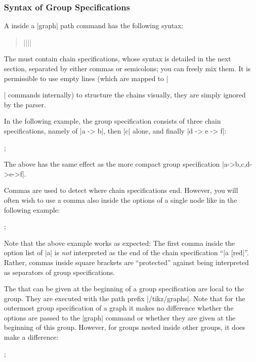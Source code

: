 \subsubsection{Syntax of Group Specifications}
\label{section-library-graphs-group-spec}

A  inside a |graph| path command has the following
syntax:
%
\begin{quote}
    |{||}|
\end{quote}
%
The  must contain chain specifications, whose syntax
is detailed in the next section, separated by either commas or semicolons; you
can freely mix them. It is permissible to use empty lines (which are mapped to
|\par| commands internally) to structure the chains visually, they are simply
ignored by the parser.

In the following example, the group specification consists of three chain
specifications, namely of |a -> b|, then |c| alone, and finally |d -> e -> f|:
%
\begin{codeexample}[]
\tikz {};
\end{codeexample}
%
The above has the same effect as the more compact group specification
|{a->b,c,d->e->f}|.

Commas are used to detect where chain specifications end. However, you will
often wish to use a comma also inside the options of a single node like in the
following example:
%
\begin{codeexample}[]
\tikz {};
\end{codeexample}

Note that the above example works as expected: The first comma inside the
option list of |a| is \emph{not} interpreted as the end of the chain
specification ``|a [red|''. Rather, commas inside square brackets are
``protected'' against being interpreted as separators of group specifications.

The  that can be given at the beginning of a group specification
are local to the group. They are executed with the path prefix |/tikz/graphs|.
Note that for the outermost group specification of a graph it makes no
difference whether the options are passed to the |graph| command or whether
they are given at the beginning of this group. However, for groups nested
inside other groups, it does make a difference:
%
\begin{codeexample}[]
\tikz {};
\end{codeexample}

